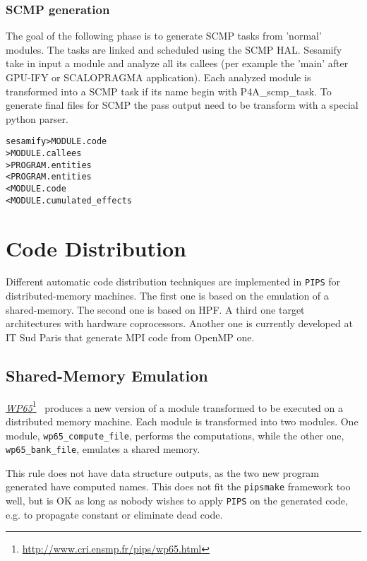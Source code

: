 \documentclass[a4paper]{report}
\newenvironment{PipsMake}{\begin{alltt}}{\end{alltt}}
\newcommand{\LINK}[2]{\href{#2}{#1}\footnote{\url{#2}}\xspace}
\newcommand{\Pips}{\texttt{PIPS}}
\newcommand{\Pipsmake}{\texttt{pipsmake}}
\newcommand{\WPsc}{\LINK{\emph{WP65}}{http://www.cri.ensmp.fr/pips/wp65.html}}
\begin{document}
\subsubsection{SCMP generation}
The goal of the following phase is to generate SCMP tasks from 'normal' modules. The tasks are linked and scheduled using the SCMP HAL.
Sesamify take in input a module and analyze all its callees (per example the 'main' after GPU-IFY or SCALOPRAGMA application).
Each analyzed module is transformed into a SCMP task if its name begin with P4A\_scmp\_task.
To generate final files for SCMP the pass output need to be transform with a special python parser.

\begin{PipsMake}
sesamify                    > MODULE.code
		> MODULE.callees
		> PROGRAM.entities
		< PROGRAM.entities
		< MODULE.code
                < MODULE.cumulated_effects
\end{PipsMake}

\section{Code Distribution}
\label{subsection-code-distribution}

Different automatic code distribution techniques are implemented in \Pips{} for
distributed-memory machines. The first one is based on the emulation of
a shared-memory. The second one is based on HPF. A third one target
architectures with hardware coprocessors. Another one is currently
developed at IT Sud Paris that generate MPI code from OpenMP one.

\subsection{Shared-Memory Emulation}
\label{subsubsection-shared-memory-emulation}

\WPsc{}~\cite{IA91,IA92a,IA92b} produces a new version of a module
transformed to be executed on a distributed memory machine. Each module
is transformed into two modules. One module, \texttt{wp65\_compute\_file},
performs the computations, while the other one, \texttt{wp65\_bank\_file},
emulates a shared memory.

This rule does not have data structure outputs, as the two new program
generated have computed names. This does not fit the \Pipsmake{} framework
too well, but is OK as long as nobody wishes to apply \Pips{} on the
generated code, e.g. to propagate constant or eliminate dead code.
\end{document}
